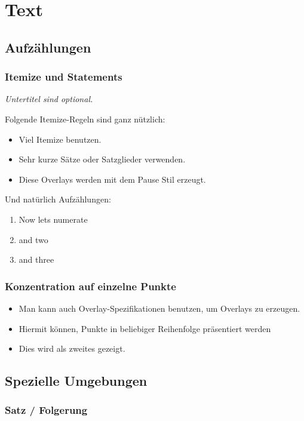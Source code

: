 \documentclass[12pt,ngerman]{scrartcl}
\begin{document}
\section{Text}

\subsection{Aufzählungen}

\subsubsection*{Itemize und Statements}

\textit{Untertitel sind optional.}

Folgende Itemize-Regeln sind ganz nützlich:
\begin{itemize}
\item Viel Itemize benutzen.
\item Sehr kurze Sätze oder Satzglieder verwenden.
\item Diese Overlays werden mit dem Pause Stil erzeugt.
\end{itemize}

Und natürlich Aufzählungen:
\begin{enumerate}
\item Now lets numerate
\item and two
\item and three
\end{enumerate}

\subsubsection*{Konzentration auf einzelne Punkte}

\begin{itemize}
\item Man kann auch Overlay-Spezifikationen benutzen, um Overlays zu erzeugen.
\item Hiermit können, Punkte in beliebiger Reihenfolge präsentiert werden
\item Dies wird als zweites gezeigt.
\end{itemize}

\subsection{Spezielle Umgebungen}

\subsubsection*{Satz / Folgerung}
\end{document}
